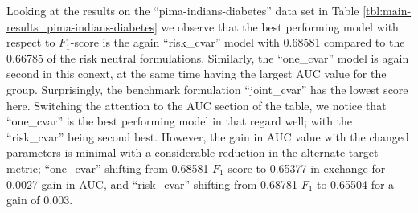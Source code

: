 \documentclass[10pt,letterpaper]{article}
\newcommand{\1}{1{\hskip -2.55 pt}\hbox{I}}
\begin{document}
Looking at the results on the ``pima-indians-diabetes'' data set in Table \ref{tbl:main-results_pima-indians-diabetes} we observe that the best performing model with respect to $F_1$-score is the again ``risk\_cvar'' model with 0.68581 compared to the 0.66785 of the risk neutral formulations. 
Similarly, the ``one\_cvar'' model is again second in this conext, at the same time having the largest AUC value for the group.
Surprisingly, the benchmark formulation ``joint\_cvar'' has the lowest score here.
Switching the attention to the AUC section of the table, we notice that ``one\_cvar'' is the best performing model in that regard well; with the ``risk\_cvar'' being second best.
However, the gain in AUC value with the changed parameters is minimal with a considerable reduction in the alternate target metric; ``one\_cvar'' shifting from 0.68581 $F_1$-score to 0.65377 in exchange for 0.0027 gain in AUC, and ``risk\_cvar'' shifting from 0.68781 $F_1$ to 0.65504 for a gain of 0.003.
\end{document}
